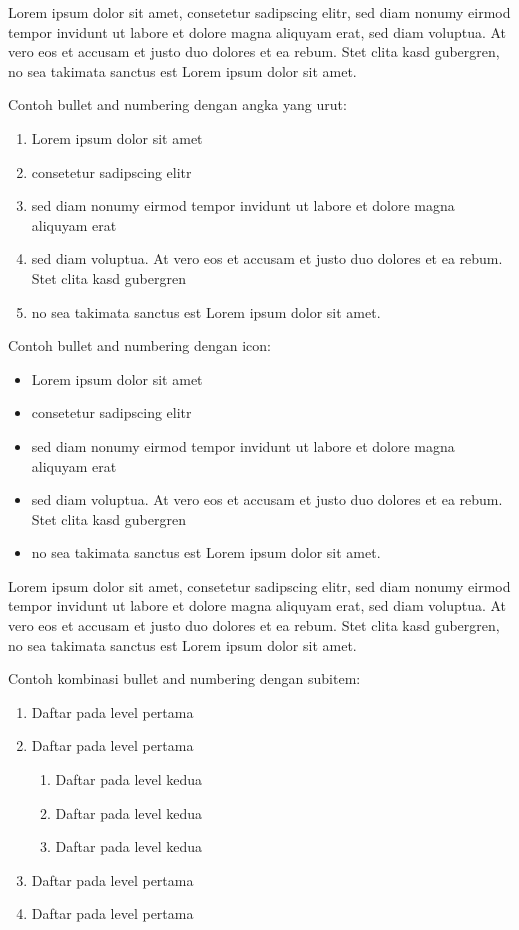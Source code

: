 Lorem ipsum dolor sit amet, consetetur sadipscing elitr, sed diam nonumy eirmod tempor invidunt ut labore et dolore magna aliquyam erat, sed diam voluptua. At vero eos et accusam et justo duo dolores et ea rebum. Stet clita kasd gubergren, no sea takimata sanctus est Lorem ipsum dolor sit amet.

\bigskip
\noindent
Contoh bullet and numbering dengan angka yang urut:
\begin{enumerate}
\item Lorem ipsum dolor sit amet
\item consetetur sadipscing elitr
\item sed diam nonumy eirmod tempor invidunt ut labore et dolore magna aliquyam erat
\item sed diam voluptua. At vero eos et accusam et justo duo dolores et ea rebum. Stet clita kasd gubergren
\item no sea takimata sanctus est Lorem ipsum dolor sit amet.
\end{enumerate}

\bigskip

\noindent
Contoh bullet and numbering dengan icon:
\begin{itemize}
\item Lorem ipsum dolor sit amet
\item consetetur sadipscing elitr
\item sed diam nonumy eirmod tempor invidunt ut labore et dolore magna aliquyam erat
\item sed diam voluptua. At vero eos et accusam et justo duo dolores et ea rebum. Stet clita kasd gubergren
\item no sea takimata sanctus est Lorem ipsum dolor sit amet.
\end{itemize}


Lorem ipsum dolor sit amet, consetetur sadipscing elitr, sed diam nonumy eirmod tempor invidunt ut labore et dolore magna aliquyam erat, sed diam voluptua. At vero eos et accusam et justo duo dolores et ea rebum. Stet clita kasd gubergren, no sea takimata sanctus est Lorem ipsum dolor sit amet.

\bigskip
\noindent
Contoh kombinasi bullet and numbering dengan subitem:
\begin{enumerate}
\item Daftar pada level pertama
\item Daftar pada level pertama
\begin{enumerate}
\item Daftar pada level kedua
\item Daftar pada level kedua
\item Daftar pada level kedua
\end{enumerate}
\item Daftar pada level pertama
\item Daftar pada level pertama
\end{enumerate}
